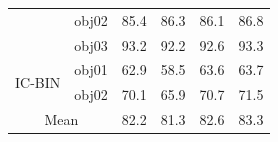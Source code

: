 \begin{table}[b]
\begin{tabular}{c|c|cccc}
\multicolumn{1}{l|}{}                        & \multicolumn{1}{c|}{obj02}       & \cellcolor[HTML]{D0E8F0} 85.4 & \cellcolor[HTML]{F8E8E8} 86.3 & \cellcolor[HTML]{E8F4F8} 86.1 & \cellcolor[HTML]{F0D0D0} 86.8 \\
\multicolumn{1}{l|}{}                        & \multicolumn{1}{c|}{obj03}       & \cellcolor[HTML]{F8E8E8} 93.2 & \cellcolor[HTML]{D0E8F0} 92.2 & \cellcolor[HTML]{E8F4F8} 92.6 & \cellcolor[HTML]{F0D0D0} 93.3 \\
\midrule
\multicolumn{1}{l|}{\multirow{2}{*}{IC-BIN \cite{icbin}}} & \multicolumn{1}{c|}{obj01}       & \cellcolor[HTML]{E8F4F8} 62.9 & \cellcolor[HTML]{D0E8F0} 58.5 & \cellcolor[HTML]{F8E8E8} 63.6 & \cellcolor[HTML]{F0D0D0} 63.7 \\
\multicolumn{1}{l|}{}                        & \multicolumn{1}{c|}{obj02}       & \cellcolor[HTML]{E8F4F8} 70.1 & \cellcolor[HTML]{D0E8F0} 65.9 & \cellcolor[HTML]{F8E8E8} 70.7 & \cellcolor[HTML]{F0D0D0} 71.5 \\
\midrule
\multicolumn{2}{c|}{Mean}                                                       & \cellcolor[HTML]{E8F4F8} 82.2 & \cellcolor[HTML]{D0E8F0} 81.3 & \cellcolor[HTML]{F8E8E8} 82.6 & \cellcolor[HTML]{F0D0D0} 83.3 \\
\bottomrule
\end{tabular}
\label{tab2}
\end{table}
